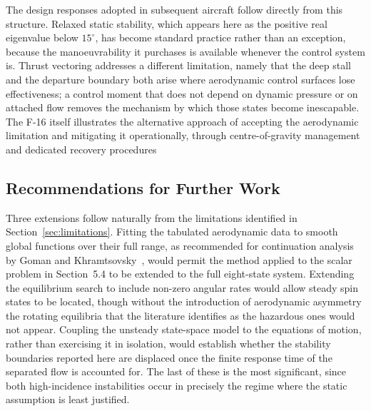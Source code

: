 \documentclass[
bindingoffset=5mm,  %
footnoteindent=3mm, %
hyphenation=true    %
]{src/wut-thesis}
\begin{document}
 The design responses adopted in subsequent aircraft follow directly from this
 structure. Relaxed static stability, which appears here as the positive real
 eigenvalue below $15^{\circ}$, has become standard practice rather than an
 exception, because the manoeuvrability it purchases is available whenever the
 control system is. Thrust vectoring addresses a different limitation, namely
 that the deep stall and the departure boundary both arise where aerodynamic
 control surfaces lose effectiveness; a control moment that does not depend on
 dynamic pressure or on attached flow removes the mechanism by which those
 states become inescapable. The F-16 itself illustrates the alternative
 approach of accepting the aerodynamic limitation and mitigating it
 operationally, through centre-of-gravity management and dedicated recovery procedures
 
 
 \subsection{Recommendations for Further Work}
 
 Three extensions follow naturally from the limitations identified in
 Section~\ref{sec:limitations}. Fitting the tabulated aerodynamic data to smooth global functions over their full range, as recommended for continuation analysis by Goman and Khramtsovsky~\cite{goman1998}, would permit the method applied to the scalar problem in Section~5.4 to be extended to the
 full eight-state system. Extending the equilibrium search to include non-zero angular rates would allow steady spin states to be located, though without the introduction of aerodynamic asymmetry the rotating equilibria that the literature identifies as the hazardous ones would not appear. Coupling the unsteady state-space model to the equations of
 motion, rather than exercising it in isolation, would establish whether the
 stability boundaries reported here are displaced once the finite response time
 of the separated flow is accounted for. The last of these is the most
 significant, since both high-incidence instabilities occur in precisely the
 regime where the static assumption is least justified.
 
 
	
 \printbibliography
 
\end{document}
